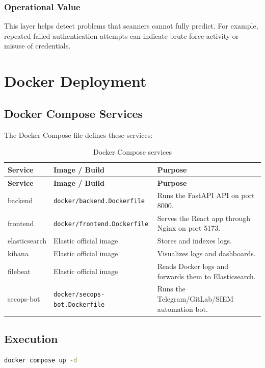 \documentclass[12pt,a4paper]{report}
\begin{document}
\subsection{Operational Value}

This layer helps detect problems that scanners cannot fully predict. For example, repeated failed authentication attempts can indicate brute force activity or misuse of credentials.

\chapter{Docker Deployment}

\section{Docker Compose Services}

The Docker Compose file defines these services:

\begin{longtable}{p{3.5cm}p{5cm}p{6cm}}
\caption{Docker Compose services} \\
\toprule
\textbf{Service} & \textbf{Image / Build} & \textbf{Purpose} \\
\midrule
\endfirsthead
\toprule
\textbf{Service} & \textbf{Image / Build} & \textbf{Purpose} \\
\midrule
\endhead
backend & \texttt{docker/backend.Dockerfile} & Runs the FastAPI API on port 8000. \\
frontend & \texttt{docker/frontend.Dockerfile} & Serves the React app through Nginx on port 5173. \\
elasticsearch & Elastic official image & Stores and indexes logs. \\
kibana & Elastic official image & Visualizes logs and dashboards. \\
filebeat & Elastic official image & Reads Docker logs and forwards them to Elasticsearch. \\
secops-bot & \texttt{docker/secops-bot.Dockerfile} & Runs the Telegram/GitLab/SIEM automation bot. \\
\bottomrule
\end{longtable}

\section{Execution}

\begin{lstlisting}[language=bash,caption={Run the stack with Docker Compose}]
docker compose up -d
\end{lstlisting}
\end{document}
